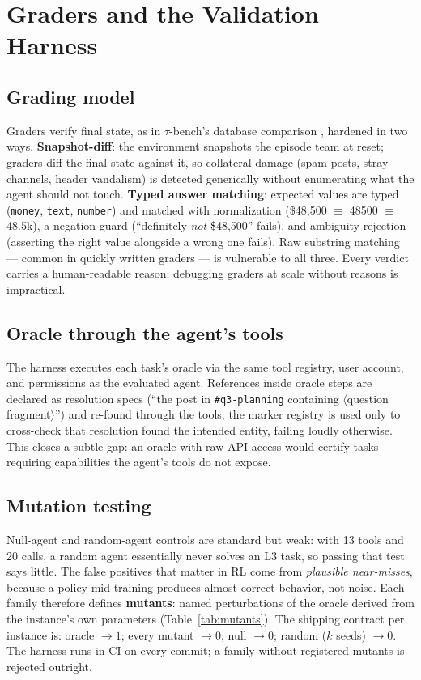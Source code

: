 \documentclass[10pt]{article}
\begin{document}
\section{Graders and the Validation Harness}\label{sec:harness}

\subsection{Grading model}
Graders verify final state, as in $\tau$-bench's database comparison \cite{yao2024tau}, hardened in two ways. \textbf{Snapshot-diff}: the environment snapshots the episode team at reset; graders diff the final state against it, so collateral damage (spam posts, stray channels, header vandalism) is detected generically without enumerating what the agent should not touch. \textbf{Typed answer matching}: expected values are typed (\texttt{money}, \texttt{text}, \texttt{number}) and matched with normalization (\$48{,}500 $\equiv$ 48500 $\equiv$ 48.5k), a negation guard (``definitely \emph{not} \$48{,}500'' fails), and ambiguity rejection (asserting the right value alongside a wrong one fails). Raw substring matching --- common in quickly written graders --- is vulnerable to all three. Every verdict carries a human-readable reason; debugging graders at scale without reasons is impractical.

\subsection{Oracle through the agent's tools}
The harness executes each task's oracle via the same tool registry, user account, and permissions as the evaluated agent. References inside oracle steps are declared as resolution specs (``the post in \texttt{\#q3-planning} containing $\langle$question fragment$\rangle$'') and re-found through the tools; the marker registry is used only to cross-check that resolution found the intended entity, failing loudly otherwise. This closes a subtle gap: an oracle with raw API access would certify tasks requiring capabilities the agent's tools do not expose.

\subsection{Mutation testing}
Null-agent and random-agent controls are standard but weak: with 13 tools and 20 calls, a random agent essentially never solves an L3 task, so passing that test says little. The false positives that matter in RL come from \emph{plausible near-misses}, because a policy mid-training produces almost-correct behavior, not noise. Each family therefore defines \textbf{mutants}: named perturbations of the oracle derived from the instance's own parameters (Table~\ref{tab:mutants}). The shipping contract per instance is: oracle $\to 1$; every mutant $\to 0$; null $\to 0$; random ($k$ seeds) $\to 0$. The harness runs in CI on every commit; a family without registered mutants is rejected outright.
\end{document}
